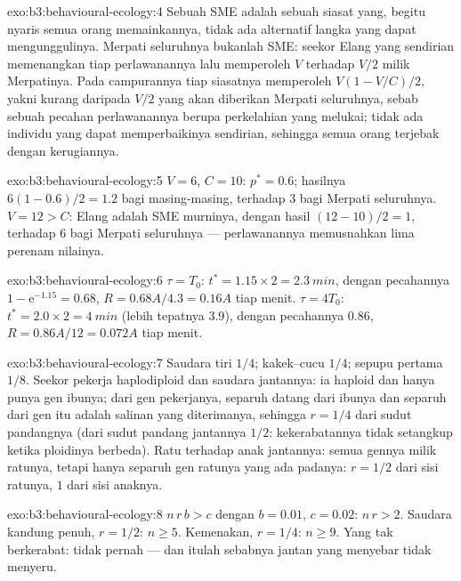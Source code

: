 \begin{solution}{exo:b3:behavioural-ecology:4}
Sebuah SME adalah sebuah siasat yang, begitu nyaris semua orang memainkannya, tidak ada
alternatif langka yang dapat mengunggulinya. Merpati seluruhnya bukanlah SME: seekor Elang yang sendirian memenangkan tiap
perlawanannya lalu memperoleh $V$ terhadap $V/2$ milik Merpatinya. Pada campurannya tiap
siasatnya memperoleh $V(1 - V/C)/2$, yakni kurang daripada $V/2$ yang akan diberikan Merpati seluruhnya,
sebab sebuah pecahan perlawanannya berupa perkelahian yang melukai; tidak ada individu
yang dapat memperbaikinya sendirian, sehingga semua orang terjebak dengan kerugiannya.
\end{solution}

\begin{solution}{exo:b3:behavioural-ecology:5}
$V = 6$, $C = 10$: $p^{*} = 0.6$; hasilnya $6(1 - 0.6)/2 = 1.2$ bagi masing-masing,
terhadap $3$ bagi Merpati seluruhnya. $V = 12 > C$: Elang adalah SME murninya, dengan hasil
$(12 - 10)/2 = 1$, terhadap $6$ bagi Merpati seluruhnya --- perlawanannya memusnahkan
lima perenam nilainya.
\end{solution}

\begin{solution}{exo:b3:behavioural-ecology:6}
$\tau = T_{0}$: $t^{*} = 1.15\times 2 = \qty{2.3}{min}$, dengan pecahannya $1 -
\mathrm{e}^{-1.15} = 0.68$, $R = 0.68A/4.3 = 0.16A$ tiap menit. $\tau =
4T_{0}$: $t^{*} = 2.0\times 2 = \qty{4}{min}$ (lebih tepatnya $3.9$),
dengan pecahannya $0.86$, $R = 0.86A/12 = 0.072A$ tiap menit.
\end{solution}

\begin{solution}{exo:b3:behavioural-ecology:7}
Saudara tiri $1/4$; kakek--cucu $1/4$; sepupu pertama $1/8$.
Seekor pekerja haplodiploid dan saudara jantannya: ia haploid dan hanya punya
gen ibunya; dari gen pekerjanya, separuh datang dari ibunya
dan separuh dari gen itu adalah salinan yang diterimanya, sehingga $r = 1/4$ dari sudut
pandangnya (dari sudut pandang jantannya $1/2$: kekerabatannya tidak setangkup ketika
ploidinya berbeda). Ratu terhadap anak jantannya: semua gennya milik ratunya, tetapi hanya separuh
gen ratunya yang ada padanya: $r = 1/2$ dari sisi ratunya, $1$ dari sisi anaknya.
\end{solution}

\begin{solution}{exo:b3:behavioural-ecology:8}
$n\,r\,b > c$ dengan $b = 0.01$, $c = 0.02$: $n\,r > 2$. Saudara kandung penuh, $r
= 1/2$: $n \ge 5$. Kemenakan, $r = 1/4$: $n \ge 9$. Yang tak berkerabat: tidak pernah ---
dan itulah sebabnya jantan yang menyebar tidak menyeru.
\end{solution}

